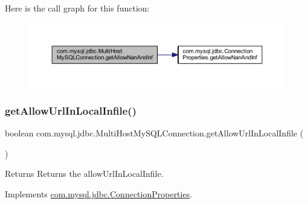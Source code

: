 Here is the call graph for this function\+:
\nopagebreak
\begin{figure}[H]
\begin{center}
\leavevmode
\includegraphics[width=350pt]{classcom_1_1mysql_1_1jdbc_1_1_multi_host_my_s_q_l_connection_a3f62430d18cd00a4f9e11a0271ad46af_cgraph}
\end{center}
\end{figure}
\mbox{\label{classcom_1_1mysql_1_1jdbc_1_1_multi_host_my_s_q_l_connection_a53db1b48cd5ab66d570f369452f7295a}} 
\subsubsection{\texorpdfstring{get\+Allow\+Url\+In\+Local\+Infile()}{getAllowUrlInLocalInfile()}}
{\footnotesize\ttfamily boolean com.\+mysql.\+jdbc.\+Multi\+Host\+My\+S\+Q\+L\+Connection.\+get\+Allow\+Url\+In\+Local\+Infile (\begin{DoxyParamCaption}{ }\end{DoxyParamCaption})}

\begin{DoxyReturn}{Returns}
Returns the allow\+Url\+In\+Local\+Infile. 
\end{DoxyReturn}


Implements \mbox{\hyperlink{interfacecom_1_1mysql_1_1jdbc_1_1_connection_properties_aa0b1ef6e51c18b41376c5651833f11b8}{com.\+mysql.\+jdbc.\+Connection\+Properties}}.

